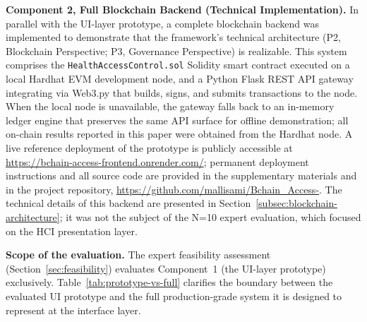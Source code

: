 \documentclass[journal,onecolumn]{IEEEtran}
\begin{document}
\textbf{Component 2, Full Blockchain Backend (Technical Implementation).} In parallel with the UI-layer prototype, a complete blockchain backend was implemented to demonstrate that the framework's technical architecture (P2, Blockchain Perspective; P3, Governance Perspective) is realizable. This system comprises the \texttt{HealthAccessControl.sol} Solidity smart contract executed on a local Hardhat EVM development node, and a Python Flask REST API gateway integrating via Web3.py that builds, signs, and submits transactions to the node. When the local node is unavailable, the gateway falls back to an in-memory ledger engine that preserves the same API surface for offline demonstration; all on-chain results reported in this paper were obtained from the Hardhat node. A live reference deployment of the prototype is publicly accessible at \url{https://bchain-access-frontend.onrender.com/}; permanent deployment instructions and all source code are provided in the supplementary materials and in the project repository, \url{https://github.com/mallisami/Bchain_Access-}. The technical details of this backend are presented in Section~\ref{subsec:blockchain-architecture}; it was not the subject of the N=10 expert evaluation, which focused on the HCI presentation layer.

\textbf{Scope of the evaluation.} The expert feasibility assessment (Section~\ref{sec:feasibility}) evaluates Component~1 (the UI-layer prototype) exclusively. Table~\ref{tab:prototype-vs-full} clarifies the boundary between the evaluated UI prototype and the full production-grade system it is designed to represent at the interface layer.
\end{document}
